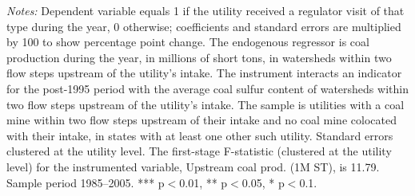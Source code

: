 \begin{table}[htbp]
\begin{minipage}{\linewidth}
\footnotesize
\raggedright
\textit{Notes:} Dependent variable equals 1 if the utility received a regulator visit of that type during the year, 0 otherwise; coefficients and standard errors are multiplied by 100 to show percentage point change. The endogenous regressor is coal production during the year, in millions of short tons, in watersheds within two flow steps upstream of the utility's intake. The instrument interacts an indicator for the post-1995 period with the average coal sulfur content of watersheds within two flow steps upstream of the utility's intake. The sample is utilities with a coal mine within two flow steps upstream of their intake and no coal mine colocated with their intake, in states with at least one other such utility. Standard errors clustered at the utility level. The first-stage F-statistic (clustered at the utility level) for the instrumented variable, Upstream coal prod. (1M ST), is 11.79. Sample period 1985--2005. *** p$<$0.01, ** p$<$0.05, * p$<$0.1.
\end{minipage}
\end{table}
